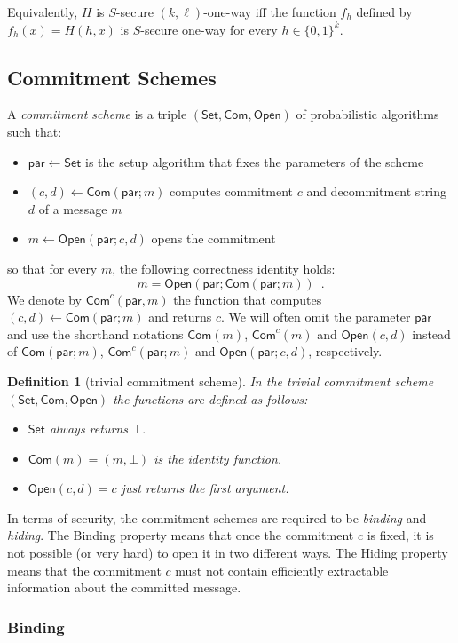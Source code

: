 \documentclass{article}
\newtheorem{definition}{Definition}[section]
\newcommand{\setup}[0]{\mathsf{Set}}
\newcommand{\commit}[0]{\mathsf{Com}}
\newcommand{\open}[0]{\mathsf{Open}}
\newcommand{\commitc}[0]{\mathsf{Com}^{c}}
\newcommand{\param}[0]{\mathsf{par}}
\begin{document}
\noindent Equivalently, $H$ is $S$-secure $(k,\ell)$-one-way iff the function $f_h$ defined by $f_h(x)=H(h,x)$ is $S$-secure one-way for every $h\in\{0,1\}^k$.

\subsection{Commitment Schemes}

A \emph{commitment scheme} is a triple $(\setup, \commit, \open)$ of probabilistic algorithms such that:
\begin{itemize}
\item $\param\gets\setup$ is the setup algorithm that fixes the parameters of the scheme
\item $(c,d)\gets \commit(\param; m)$ computes commitment $c$ and
decommitment string $d$ of a message $m$
\item $m\gets \open(\param; c, d)$ opens the commitment
\end{itemize}
so that for every $m$, the following correctness identity holds:
\[
m=\open(\param; \commit(\param; m))\enspace.
\]
We denote by $\commitc(\param,m)$ the function that computes $(c,d)\gets \commit(\param; m)$ and returns $c$.
We will often omit the parameter $\param$ and use the shorthand notations $\commit(m)$, $\commitc(m)$ and $\open(c,d)$ instead of $\commit(\param; m)$,
$\commitc(\param; m)$ and $\open(\param; c, d)$, respectively.
\medskip

\begin{definition}[trivial commitment scheme]
In the trivial commitment scheme $(\setup,\commit,\open)$ the functions are defined as follows:
\begin{itemize}
\item $\setup$ always returns $\bot$.
\item $\commit(m)=(m,\bot)$ is the identity function.
\item $\open (c,d) = c$ just returns the first argument.
\end{itemize}
\end{definition}

\noindent In terms of security, the commitment schemes are required to be \emph{binding} and \emph{hiding}. The Binding property means that once the commitment $c$ is fixed, it is not possible (or very hard) to open it in two different ways. The Hiding property means that the commitment $c$ must not contain efficiently extractable information about the committed message.

\subsubsection{Binding}
\end{document}
